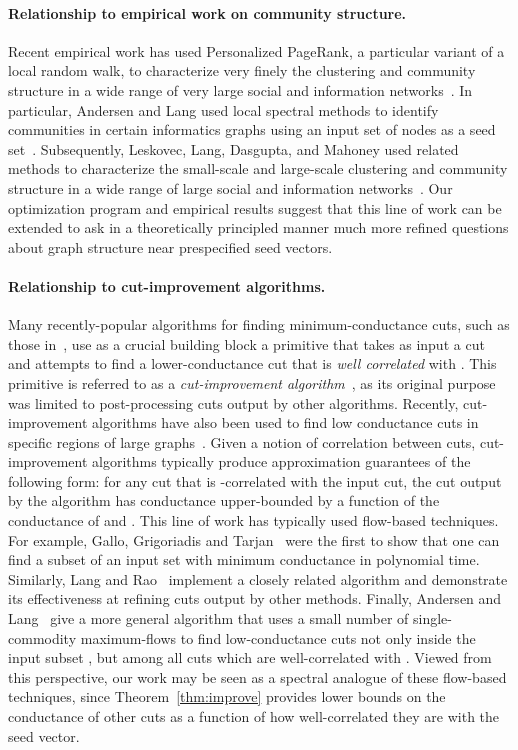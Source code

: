 \documentclass[11pt]{article}
\begin{document}
\paragraph{Relationship to empirical work on community structure.}
Recent empirical work has used Personalized PageRank, a particular variant 
of a local random walk, to characterize very finely the clustering and 
community structure in a wide range of very large social and information 
networks~\cite{andersen06seed,LLDM08_communities_CONF,LLDM09_communities_IM,LLM10_communities_CONF}. 
In particular, Andersen and Lang used local spectral methods to identify 
communities in certain informatics graphs using an input set of nodes as a 
seed set~\cite{andersen06seed}.
Subsequently, Leskovec, Lang, Dasgupta, and Mahoney used related 
methods to characterize the small-scale and large-scale clustering and 
community structure in a wide range of large social and information 
networks~\cite{LLDM08_communities_CONF,LLDM09_communities_IM,LLM10_communities_CONF}. 
Our optimization program and empirical results suggest that this line of 
work can be extended to ask in a theoretically principled manner much more 
refined questions about graph structure near prespecified seed vectors. 


\paragraph{Relationship to cut-improvement algorithms.}
Many recently-popular algorithms for finding minimum-conductance cuts, 
such as those in~\cite{khandekar06_partitioning,OSVV08}, use as a crucial 
building block a primitive that takes as input a cut  and 
attempts to find a lower-conductance cut that is {\em well correlated} 
with . 
This primitive is referred to as a \emph{cut-improvement 
algorithm}~\cite{kevin04mqi,andersen08soda}, as its original purpose was 
limited to post-processing cuts output by other algorithms. 
Recently, cut-improvement algorithms have also been used to find low 
conductance cuts in specific regions of large graphs~\cite{LLM10_communities_CONF}. 
Given a notion of correlation between cuts, cut-improvement algorithms 
typically produce approximation guarantees of the following form:
for any cut  that is -correlated with the input 
cut, the cut output by the algorithm has conductance upper-bounded by a 
function of the conductance of  and .
This line of work has typically used flow-based techniques.
For example, Gallo, Grigoriadis and Tarjan~\cite{Gallo:1989} were the first 
to show that one can find a subset of an input set  with 
minimum conductance in polynomial time. 
Similarly, Lang and Rao~\cite{kevin04mqi} implement a closely related 
algorithm and demonstrate its effectiveness at refining cuts output by other 
methods. 
Finally, Andersen and Lang~\cite{andersen08soda} give a more general 
algorithm that uses a small number of single-commodity maximum-flows to find 
low-conductance cuts not only inside the input subset , but among all 
cuts which are well-correlated with . 
Viewed from this perspective, our work may be seen as a spectral analogue 
of these flow-based techniques, since Theorem~\ref{thm:improve} provides 
lower bounds on the conductance of other cuts as a function of how 
well-correlated they are with the seed vector.
\end{document}

